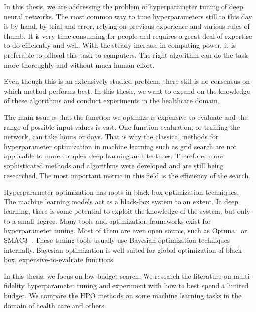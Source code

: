 


In this thesis, we are addressing the problem of hyperparameter tuning of deep neural networks. The most common way to tune hyperparameters still to this day is by hand, by trial and error, relying on previous experience and various rules of thumb. It is very time-consuming for people and requires a great deal of expertise to do efficiently and well.
With the steady increase in computing power, it is preferable to offload this task to computers. The right algorithm can do the task more thoroughly and without much human effort.

Even though this is an extensively studied problem, there still is no consensus on which method performs best. In this thesis, we want to expand on the knowledge of these algorithms and conduct experiments in the healthcare domain.

The main issue is that the function we optimize is expensive to evaluate and the range of possible input values is vast. One function evaluation, or training the network, can take hours or days. That is why the classical methods for hyperparameter optimization in machine learning such as grid search are not applicable to more complex deep learning architectures. Therefore, more sophisticated methods and algorithms were developed and are still being researched. The most important metric in this field is the efficiency of the search.

Hyperparameter optimization has roots in black-box optimization techniques. The machine learning models act as a black-box system to an extent. In deep learning, there is some potential to exploit the knowledge of the system, but only to a small degree. Many tools and optimization frameworks exist for hyperparameter tuning. Most of them are even open source, such as Optuna~\cite{akiba2019optuna} or SMAC3~\cite{smac3}. These tuning tools usually use Bayesian optimization techniques internally. Bayesian optimization is well suited for global optimization of black-box, expensive-to-evaluate functions.


In this thesis, we focus on low-budget search. We research the literature on multi-fidelity hyperparameter tuning and experiment with how to best spend a limited budget. We compare the HPO methods on some machine learning tasks in the domain of health care and others.


